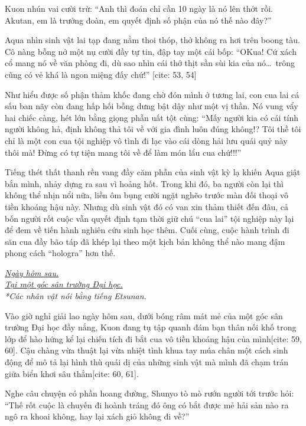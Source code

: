 \documentclass[../main.tex]{subfiles}
\begin{document}
Kuon nhún vai cười trừ: ``Anh thì đoán chỉ cần 10 ngày là nó lên thớt rồi. Akutan, em là trưởng đoàn, em quyết định số phận của nó thế nào đây?''

Aqua nhìn sinh vật lai tạp đang nằm thoi thóp, thở không ra hơi trên boong tàu. Cô nàng bỗng nở một nụ cười đầy tự tin, đập tay một cái bốp: ``OKua! Cứ xách cổ mang nó về văn phòng đi, dù sao nhìn cái thớ thịt sần sùi kia của nó\dots\ trông cũng có vẻ khá là ngon miệng đấy chứ!'' [cite: 53, 54]

Như hiểu được số phận thảm khốc đang chờ đón mình ở tương lai, con cua lai cá sấu ban nãy còn đang hấp hối bỗng dưng bật dậy như một vị thần. Nó vung vẩy hai chiếc càng, hét lớn bằng giọng phẫn uất tột cùng: ``Mấy người kia có cái tính người không hả, định không thả tôi về với gia đình luôn đúng không!?  Tôi thề tôi chỉ là một con cua tội nghiệp vô tình đi lạc vào cái dòng hải lưu quái quỷ này thôi mà!  Đừng có tự tiện mang tôi về để làm món lẩu cua chứ!!!''

Tiếng thét thất thanh rền vang đầy căm phẫn của sinh vật kỳ lạ khiến Aqua giật bắn mình, nhảy dựng ra sau vì hoảng hốt. Trong khi đó, ba người còn lại thì không thể nhịn nổi nữa, liền ôm bụng cười ngặt nghẽo trước màn đối thoại vô tiền khoáng hậu này. Nhưng dù sinh vật đó có van xin thảm thiết đến đâu, cả bốn người rốt cuộc vẫn quyết định tạm thời giữ chú ``cua lai'' tội nghiệp này lại để đem về tiến hành nghiên cứu sinh học thêm. Cuối cùng, cuộc hành trình đi săn cua đầy bão táp đã khép lại theo một kịch bản không thể nào mang đậm phong cách ``hologra'' hơn thế.

\omk

\begin{center}
  \textit{\uline{Ngày hôm sau.\\Tại một góc sân trường Đại học.}}\\
  \textit{*Các nhân vật nói bằng tiếng Etsunan.}
\end{center}

Vào giờ nghỉ giải lao ngày hôm sau, dưới bóng râm mát mẻ của một góc sân trường Đại học đầy nắng, Kuon đang tụ tập quanh đám bạn thân nối khố trong lớp để hào hứng kể lại chiến tích đi bắt cua vô tiền khoáng hậu của mình[cite: 59, 60]. Cậu chàng vừa thuật lại vừa nhiệt tình khua tay múa chân một cách sinh động để mô tả lại hình thù quái dị của những sinh vật mà mình đã chạm trán giữa biển khơi sâu thẳm[cite: 60, 61].

Nghe câu chuyện có phần hoang đường, Shunyo tò mò rướn người tới trước hỏi: ``Thế rốt cuộc là chuyến đi hoành tráng đó ông có bắt được mẻ hải sản nào ra ngô ra khoai không, hay lại xách giỏ không đi về?''
\end{document}

